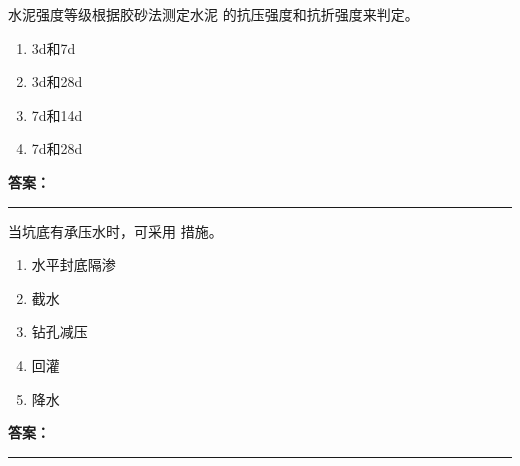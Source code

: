 \documentclass[UTF8,fontset=fandol,11pt]{ctexart}
\newcommand{\answerline}{\textcolor{answerred}{\rule{2.4cm}{0.7pt}}}
\begin{document}
\vspace{0.2em}

\begin{quizbox}[title={乱序第 247 题｜第四章混凝土结构工程}]

水泥强度等级根据胶砂法测定水泥 的抗压强度和抗折强度来判定。\\

\begin{enumerate}[label=\Alph*.]

\item 3d和7d

\item 3d和28d

\item 7d和14d

\item 7d和28d

\end{enumerate}

\textbf{\textcolor{answerred}{答案：}} \answerline

\end{quizbox}

\vspace{0.2em}

\begin{quizbox}[title={乱序第 248 题｜第三章基坑工程}]

当坑底有承压水时，可采用 措施。\\

\begin{enumerate}[label=\Alph*.]

\item 水平封底隔渗

\item 截水

\item 钻孔减压

\item 回灌

\item 降水

\end{enumerate}

\textbf{\textcolor{answerred}{答案：}} \answerline

\end{quizbox}

\vspace{0.2em}
\end{document}
